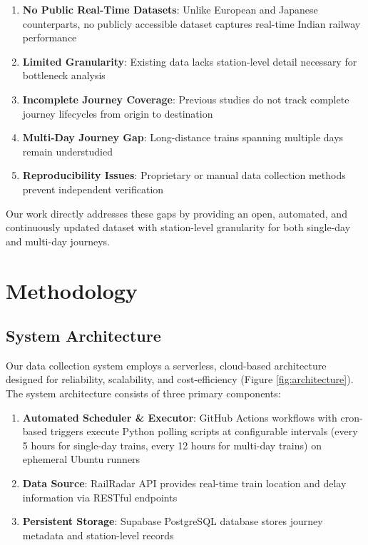 \documentclass[11pt,a4paper]{article}
\begin{document}
\begin{enumerate}
    \item \textbf{No Public Real-Time Datasets}: Unlike European and Japanese counterparts, no publicly accessible dataset captures real-time Indian railway performance
    \item \textbf{Limited Granularity}: Existing data lacks station-level detail necessary for bottleneck analysis
    \item \textbf{Incomplete Journey Coverage}: Previous studies do not track complete journey lifecycles from origin to destination
    \item \textbf{Multi-Day Journey Gap}: Long-distance trains spanning multiple days remain understudied
    \item \textbf{Reproducibility Issues}: Proprietary or manual data collection methods prevent independent verification
\end{enumerate}

Our work directly addresses these gaps by providing an open, automated, and continuously updated dataset with station-level granularity for both single-day and multi-day journeys.

\section{Methodology}

\subsection{System Architecture}

Our data collection system employs a serverless, cloud-based architecture designed for reliability, scalability, and cost-efficiency (Figure \ref{fig:architecture}). The system architecture consists of three primary components:

\begin{enumerate}
    \item \textbf{Automated Scheduler \& Executor}: GitHub Actions workflows with cron-based triggers execute Python polling scripts at configurable intervals (every 5 hours for single-day trains, every 12 hours for multi-day trains) on ephemeral Ubuntu runners
    \item \textbf{Data Source}: RailRadar API provides real-time train location and delay information via RESTful endpoints
    \item \textbf{Persistent Storage}: Supabase PostgreSQL database stores journey metadata and station-level records
\end{enumerate}
\end{document}
